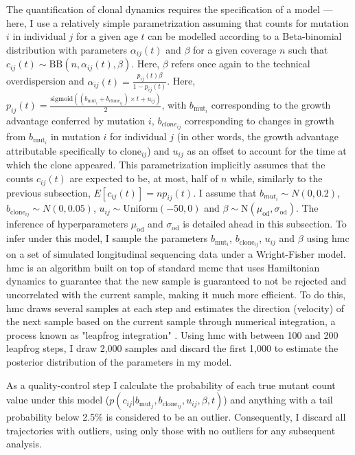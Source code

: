 The quantification of clonal dynamics requires the specification of a model --- here, I use a relatively simple parametrization assuming that counts for mutation $i$ in individual $j$ for a given age $t$ can be modelled according to a Beta-binomial distribution with parameters $\alpha_{ij}(t)$ and $\beta$ for a given coverage $n$ such that $c_{ij}(t) \sim \mathrm{BB}(n,\alpha_{ij}(t),\beta)$. Here, $\beta$ refers once again to the technical overdispersion and $\alpha_{ij}(t) = \frac{p_{ij}(t)\beta}{1-p_{ij}(t)}$. Here, $p_{ij}(t) = \frac{\mathrm{sigmoid}((b_{\mathrm{mut}_i} + b_{\mathrm{clone}_{ij}}) \times t + u_{ij})}{2}$, with $b_{\mathrm{mut}_i}$ corresponding to the growth advantage conferred by mutation $i$, $b_{clone_{ij}}$ corresponding to changes in growth from $b_{\mathrm{mut}_i}$ in mutation $i$ for individual $j$ (in other words, the growth advantage attributable specifically to $\mathrm{clone}_{ij}$) and $u_{ij}$ as an offset to account for the time at which the clone appeared. This parametrization implicitly assumes that the counts $c_{ij}(t)$ are expected to be, at most, half of $n$ while, similarly to the previous subsection, $E[c_{ij}(t)] = np_{ij}(t)$. I assume that $b_{mut_i} \sim N(0,0.2)$, $b_{\mathrm{clone}_{ij}} \sim N(0,0.05)$, $u_{ij} \sim \mathrm{Uniform}(-50,0)$ and $\beta \sim \mathrm{N}(\mu_{\mathrm{od}},\sigma_{\mathrm{od}})$. The inference of hyperparameters $\mu_{\mathrm{od}}$ and $\sigma_{\mathrm{od}}$ is detailed ahead in this subsection. To infer under this model, I sample the parameters $b_{\mathrm{mut}_i}$, $b_{\mathrm{clone}_{ij}}$, $u_{ij}$ and $\beta$ using \ac{hmc} on a set of simulated longitudinal sequencing data under a Wright-Fisher model. \Ac{hmc} is an algorithm built on top of standard \ac{mcmc} that uses Hamiltonian dynamics to guarantee that the new sample is guaranteed to not be rejected and uncorrelated with the current sample, making it much more efficient. To do this, \ac{hmc} draws several samples at each step and estimates the direction (velocity) of the next sample based on the current sample through numerical integration, a process known as "leapfrog integration" \cite{Neal2011-lj}. Using \ac{hmc} with between 100 and 200 leapfrog steps, I draw 2,000 samples and discard the first 1,000 to estimate the posterior distribution of the parameters in my model.

As a quality-control step I calculate the probability of each true mutant count value under this model ($p(c_{ij}|b_{\mathrm{mut}_j},b_{\mathrm{clone}_{ij}},u_{ij},\beta,t)$) and anything with a tail probability below 2.5\% is considered to be an outlier. Consequently, I discard all trajectories with outliers, using only those with no outliers for any subsequent analysis.

